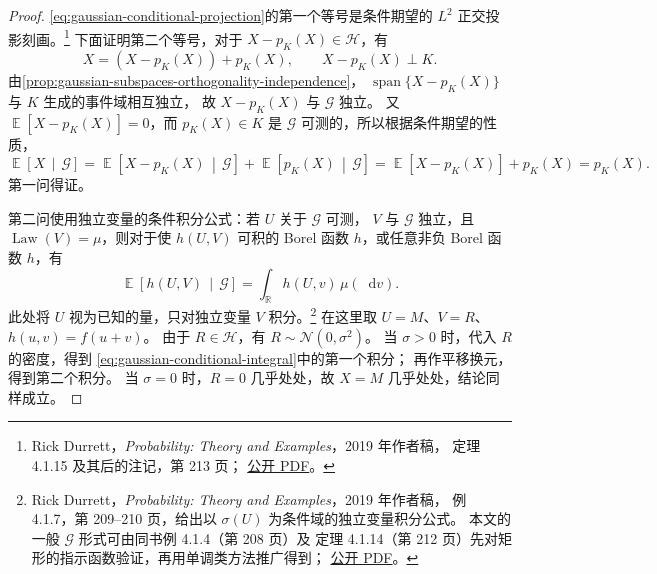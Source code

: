\documentclass[UTF8,11pt,a4paper,oneside,fontset=fandol]{ctexrep}
\numberwithin{equation}{section}
\theoremstyle{plain}
\theoremstyle{definition}
\theoremstyle{remark}
\newcommand{\R}{\mathbb{R}}
\newcommand{\Hcal}{\mathcal{H}}
\DeclareMathOperator{\E}{\mathbb{E}}
\DeclareMathOperator{\Law}{Law}
\newcommand{\dd}{\mathop{}\!\mathrm{d}}
\newcommand{\Econd}[2]{%
  \E\!\left[#1\,\middle|\,#2\right]}
\begin{document}
\begin{proof}
\cref{eq:gaussian-conditional-projection}的第一个等号是条件期望的
$L^2$ 正交投影刻画。\footnote{%
Rick Durrett，\emph{Probability: Theory and Examples}，2019 年作者稿，
定理 4.1.15 及其后的注记，第 213 页；
\href{https://sites.math.duke.edu/~rtd/PTE/PTE5_011119.pdf}{公开 PDF}。}
下面证明第二个等号，对于 $X-p_K(X)\in\Hcal$，有
\[
  X=(X-p_K(X))+p_K(X),\qquad X-p_K(X)\perp K.
\]
由\cref{prop:gaussian-subspaces-orthogonality-independence}，
$\operatorname{span}\{X-p_K(X)\}$ 与 $K$ 生成的事件域相互独立，
故 $X-p_K(X)$ 与 $\mathcal G$ 独立。
又 $\E[X-p_K(X)]=0$，而 $p_K(X)\in K$ 是 $\mathcal G$ 可测的，所以根据条件期望的性质，
\[
  \Econd{X}{\mathcal G}
  =\Econd{X-p_K(X)}{\mathcal G}+\Econd{p_K(X)}{\mathcal G}
  =\E[X-p_K(X)]+p_K(X)=p_K(X).
\]
第一问得证。

第二问使用独立变量的条件积分公式：若 $U$ 关于 $\mathcal G$ 可测，
$V$ 与 $\mathcal G$ 独立，且 $\Law(V)=\mu$，则对于使 $h(U,V)$ 可积的
Borel 函数 $h$，或任意非负 Borel 函数 $h$，有
\[
  \Econd{h(U,V)}{\mathcal G}
  =\int_{\R}h(U,v)\,\mu(\dd v).
\]
此处将 $U$ 视为已知的量，只对独立变量 $V$ 积分。\footnote{%
Rick Durrett，\emph{Probability: Theory and Examples}，2019 年作者稿，
例 4.1.7，第 209--210 页，给出以 $\sigma(U)$ 为条件域的独立变量积分公式。
本文的一般 $\mathcal G$ 形式可由同书例 4.1.4（第 208 页）及
定理 4.1.14（第 212 页）先对矩形的指示函数验证，再用单调类方法推广得到；
\href{https://sites.math.duke.edu/~rtd/PTE/PTE5_011119.pdf}{公开 PDF}。}
在这里取 $U=M$、$V=R$、$h(u,v)=f(u+v)$。
由于 $R\in\Hcal$，有 $R\sim\mathcal N(0,\sigma^2)$。
当 $\sigma>0$ 时，代入 $R$ 的密度，得到
\cref{eq:gaussian-conditional-integral}中的第一个积分；
再作平移换元，得到第二个积分。
当 $\sigma=0$ 时，$R=0$ 几乎处处，故 $X=M$ 几乎处处，结论同样成立。
\end{proof}
\end{document}
